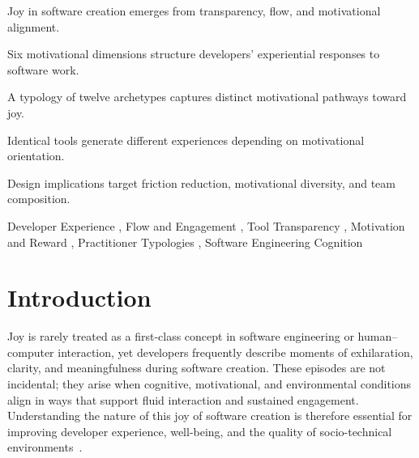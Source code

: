 \documentclass[12pt]{elsarticle}
\begin{document}
\begin{frontmatter}
\begin{highlights}
\item Joy in software creation emerges from transparency, flow, and motivational alignment.
\item Six motivational dimensions structure developers' experiential responses to software work.
\item A typology of twelve archetypes captures distinct motivational pathways toward joy.
\item Identical tools generate different experiences depending on motivational orientation.
\item Design implications target friction reduction, motivational diversity, and team composition.
\end{highlights}

\begin{keyword}
Developer Experience \sep
Flow and Engagement \sep
Tool Transparency \sep
Motivation and Reward \sep
Practitioner Typologies \sep
Software Engineering Cognition
\end{keyword}

\end{frontmatter}


\section{Introduction}
\label{sec:introduction}

Joy is rarely treated as a first-class concept in software engineering 
or human--computer interaction, yet developers frequently describe 
moments of exhilaration, clarity, and meaningfulness during software 
creation. These episodes are not incidental; they arise when cognitive, 
motivational, and environmental conditions align in ways that support 
fluid interaction and sustained engagement. Understanding the nature of 
this joy of software creation is therefore essential for improving 
developer experience, well-being, and the quality of socio-technical 
environments~\cite{ford2015,graziotin2014}.
\end{document}
